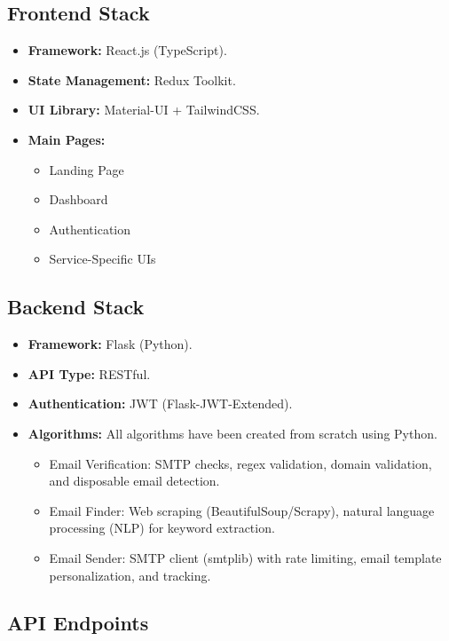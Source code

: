\documentclass{article}
\begin{document}
\subsection{Frontend Stack}
\begin{itemize}
    \item \textbf{Framework:} React.js (TypeScript).
    \item \textbf{State Management:} Redux Toolkit.
    \item \textbf{UI Library:} Material-UI + TailwindCSS.
    \item \textbf{Main Pages:}
    \begin{itemize}
        \item Landing Page
        \item Dashboard
        \item Authentication
        \item Service-Specific UIs
    \end{itemize}
\end{itemize}

\subsection{Backend Stack}
\begin{itemize}
    \item \textbf{Framework:} Flask (Python).
    \item \textbf{API Type:} RESTful.
    \item \textbf{Authentication:} JWT (Flask-JWT-Extended).
    \item \textbf{Algorithms:} All algorithms have been created from scratch using Python.
    \begin{itemize}
        \item Email Verification: SMTP checks, regex validation, domain validation, and disposable email detection.
        \item Email Finder: Web scraping (BeautifulSoup/Scrapy), natural language processing (NLP) for keyword extraction.
        \item Email Sender: SMTP client (smtplib) with rate limiting, email template personalization, and tracking.
    \end{itemize}
\end{itemize}

\subsection{API Endpoints}
\end{document}
